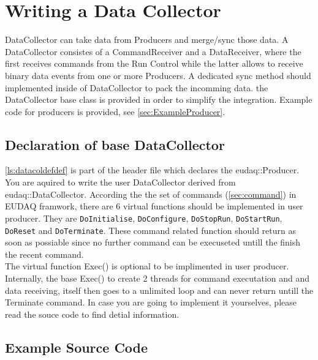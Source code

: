 \section{Writing a Data Collector}\label{sec:DataCollectorWriting}
DataCollector can take data from Producers and merge/sync those data.
A DataCollector consistes of a CommandReceiver and a DataReceiver, where the first receives commands from the Run Control while the latter allows to receive binary data events from one or more Producers. A dedicated sync method should implemented inside of DataCollector to pack the incomming data.
the DataCollector base class is provided in order to simplify the integration. Example code for producers is provided, see \autoref{sec:ExampleProducer}.


\subsection{Declaration of base DataCollector}\label{sec:datacollector_hh}

\autoref{ls:datacoldefdef} is part of the header file which declares the eudaq::Producer. You are aquired to write the user DataCollector derived from eudaq::DataCollector. According the the set of commands (\autoref{sec:command}) in EUDAQ framwork, there are 6 virtual functions should be implemented in user producer. They are \lstinline[style=cpp]{DoInitialise}, \lstinline[style=cpp]{DoConfigure}, \lstinline[style=cpp]{DoStopRun}, \lstinline[style=cpp]{DoStartRun}, \lstinline[style=cpp]{DoReset} and \lstinline[style=cpp]{DoTerminate}. These command related function should return as soon as possiable since no further command can be execuseted untill the finish the recent command. \\



The virtual function Exec() is optional to be implimented in user producer. Internally, the base Exec() to create 2 threads for command executation and and data receiving,  itself then goes to a unlimited loop and can never return untill the Terminate command. In case you are going to implement it yourselves, please read the souce code to find detial information.

\subsection{Example Source Code}\label{sec:ex0datacollector_cc}
